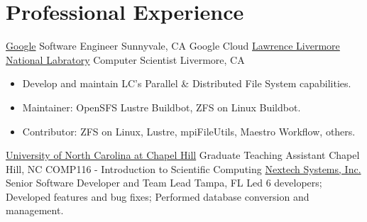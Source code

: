 \section{Professional Experience}
		{\href{http://www.google.com}{Google}}
		{Software Engineer}
		{Sunnyvale, CA}{}
		{Google Cloud}
		{\href{http://www.llnl.gov}{Lawrence Livermore National Labratory}}
		{Computer Scientist}
		{Livermore, CA}{}
		{\begin{itemize}
		\item Develop and maintain LC's Parallel \& Distributed File System capabilities.
		\item Maintainer: OpenSFS Lustre Buildbot, ZFS on Linux Buildbot.
		\item Contributor: ZFS on Linux, Lustre, mpiFileUtils, Maestro Workflow, others.
		\end{itemize}}
		{\href{http://www.unc.edu}{University of North Carolina at Chapel Hill}}
		{Graduate Teaching Assistant}
		{Chapel Hill, NC}{}
		{COMP116 - Introduction to Scientific Computing}
		{\href{http://www.nextech.com}{Nextech Systems, Inc.}}
		{Senior Software Developer and Team Lead}
		{Tampa, FL}{}
		{Led 6 developers; Developed features and
		bug fixes; Performed database conversion and management.}


